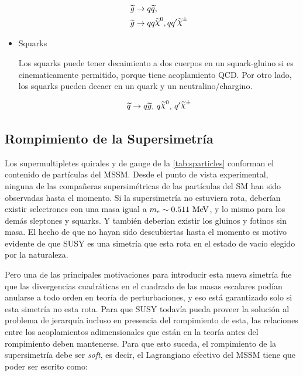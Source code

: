 \begin{itemize}
\begin{align}
  &\gluino \to q\susy{q}, \\
  &\gluino \to qq\nino, qq^\prime \chinopm
\end{align}


\item Squarks

Los squarks puede tener decaimiento a dos cuerpos en un squark-gluino si es
cinematicamente permitido, porque tiene acoplamiento QCD. Por otro
lado, los squarks pueden decaer en un quark y un neutralino/chargino.

\begin{equation}
  \susy{q} \to q\gluino, \, q\nino, \, q^\prime \chinopm
\end{equation}


\end{itemize}

\subsection{Rompimiento de la Supersimetría}

Los supermultipletes quirales y de gauge de la \cref{tab:sparticles} conforman
el contenido de partículas del MSSM. Desde el punto de vista experimental,
ninguna de las compa\~neras supersimétricas de las partículas del SM han sido
observadas hasta el momento. Si la supersimetría no estuviera rota, deberían
existir selectrones con una masa igual a $m_e \sim 0.511 \mev$, y lo mismo para
los demás sleptones y squarks. Y también deberían existir los gluinos y fotinos
sin masa. El hecho de que no hayan sido descubiertas hasta el momento es motivo
evidente de que SUSY es una simetría que esta rota en el estado de vacío elegido
por la naturaleza.

Pero una de las principales motivaciones para introducir esta nueva simetría fue
que las divergencias cuadráticas en el cuadrado de las masas escalares podían
anularse a todo orden en teoría de perturbaciones, y eso está garantizado solo
si esta simetría no esta rota. Para que SUSY todavía pueda proveer la solución
al problema de jerarquía incluso en presencia del rompimiento de esta, las
relaciones entre los acoplamientos adimensionales que están en la teoría antes
del rompimiento deben mantenerse. Para que esto suceda, el rompimiento de la
supersimetría debe ser \emph{soft}, es decir, el Lagrangiano efectivo del MSSM
tiene que poder ser escrito como:

